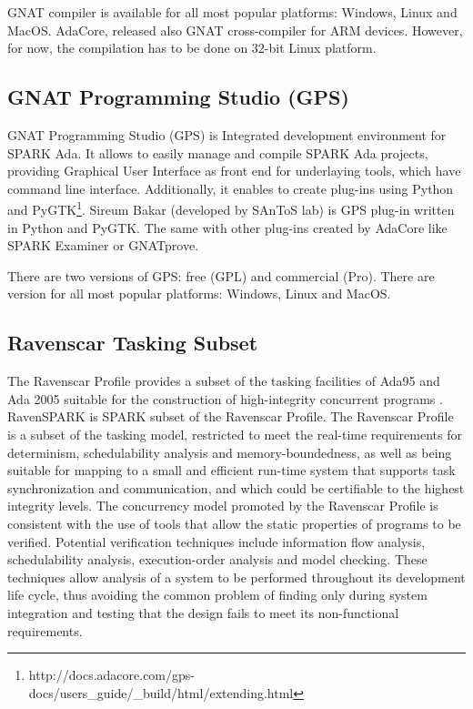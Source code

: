 GNAT compiler is available for all most popular platforms: Windows, Linux and MacOS. AdaCore, released also GNAT cross-compiler for ARM devices. However, for now, the compilation has to be done on 32-bit Linux platform.



\subsection{GNAT Programming Studio (GPS)}
\label{background:spark:gps}

GNAT Programming Studio (GPS) is Integrated development environment for SPARK Ada. It allows to easily manage and compile SPARK Ada projects, providing Graphical User Interface as front end for underlaying tools, which have command line interface. Additionally, it enables to create plug-ins using Python and PyGTK\footnote{http://docs.adacore.com/gps-docs/users\_guide/\_build/html/extending.html}. Sireum Bakar (developed by SAnToS lab) is GPS plug-in written in Python and PyGTK. The same with other plug-ins created by AdaCore like SPARK Examiner or GNATprove.

There are two versions of GPS: free (GPL) and commercial (Pro). There are version for all most popular platforms: Windows, Linux and MacOS.



\subsection{Ravenscar Tasking Subset}
\label{background:spark:ravenscar}

The Ravenscar Profile provides a subset of the tasking facilities of Ada95 and Ada 2005 suitable for the construction of high-integrity concurrent programs \cite{Ravenscar:Online}. RavenSPARK is SPARK subset of the Ravenscar Profile. The Ravenscar Profile is a subset of the tasking model, restricted to meet the real-time requirements for determinism, schedulability analysis and memory-boundedness, as well as being suitable for mapping to a small and efficient run-time system that supports task synchronization and communication, and which could be certifiable to the highest integrity levels. The concurrency model promoted by the Ravenscar Profile is consistent with the use of tools that allow the static properties of programs to be verified. Potential verification techniques include information flow analysis, schedulability analysis, execution-order analysis and model checking. These techniques allow analysis of a system to be performed throughout its development life cycle, thus avoiding the common problem of finding only during system integration and testing that the design fails to meet its non-functional requirements. \cite{Ravenscar:Article}

